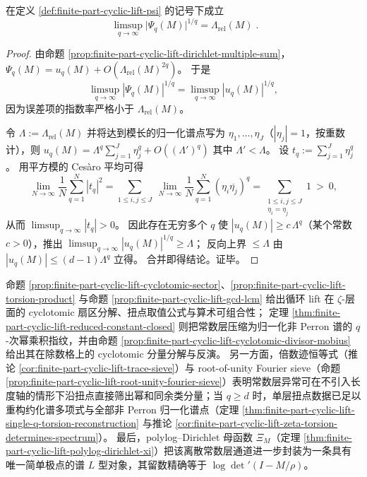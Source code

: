 \begin{theorem}[\(q\)-轴极限提取谱半径比]\label{thm:finite-part-cyclic-lift-limsup-spectral-gap}
在定义 \ref{def:finite-part-cyclic-lift-psi} 的记号下成立
\[
\boxed{\;
\limsup_{q\to\infty}\bigl|\Psi_q(M)\bigr|^{1/q}
=\Lambda_{\mathrm{rel}}(M)\; }.
\]
\end{theorem}
\begin{proof}
由命题 \ref{prop:finite-part-cyclic-lift-dirichlet-multiple-sum}，
\(
\Psi_q(M)=u_q(M)+O(\Lambda_{\mathrm{rel}}(M)^{2q})
\)。
于是
\[
\limsup_{q\to\infty}|\Psi_q(M)|^{1/q}
=\limsup_{q\to\infty}|u_q(M)|^{1/q},
\]
因为误差项的指数率严格小于 \(\Lambda_{\mathrm{rel}}(M)\)。
\par
令 \(\Lambda:=\Lambda_{\mathrm{rel}}(M)\) 并将达到模长的归一化谱点写为 \(\eta_1,\dots,\eta_J\)（\(|\eta_j|=1\)，按重数计），则
\(
 u_q(M)=\Lambda^{q}\sum_{j=1}^{J}\eta_j^{q}+O((\Lambda')^q)
\)
其中 \(\Lambda'<\Lambda\)。
设 \(t_q:=\sum_{j=1}^{J}\eta_j^{q}\)。
用平方模的 Ces\`aro 平均可得
\[
\lim_{N\to\infty}\frac{1}{N}\sum_{q=1}^{N}|t_q|^2
=\sum_{1\le i,j\le J}\ \lim_{N\to\infty}\frac{1}{N}\sum_{q=1}^{N}(\eta_i\overline{\eta_j})^{q}
=\sum_{\substack{1\le i,j\le J\\ \eta_i=\eta_j}}1\ >\ 0,
\]
从而 \(\limsup_{q\to\infty}|t_q|>0\)。
因此存在无穷多个 \(q\) 使 \(|u_q(M)|\ge c\,\Lambda^{q}\)（某个常数 \(c>0\)），推出
\(\limsup_{q\to\infty}|u_q(M)|^{1/q}\ge \Lambda\)；
反向上界 \(\le \Lambda\) 由 \(|u_q(M)|\le(d-1)\Lambda^{q}\) 立得。
合并即得结论。证毕。
\end{proof}

\begin{remark}\label{rem:finite-part-cyclic-lift-spectral-microscope}
命题 \ref{prop:finite-part-cyclic-lift-cyclotomic-sector}、\ref{prop:finite-part-cyclic-lift-torsion-product} 与命题 \ref{prop:finite-part-cyclic-lift-gcd-lcm} 给出循环 lift 在 \(\zeta\)-层面的 cyclotomic 扇区分解、扭点取值公式与算术可组合性；
定理 \ref{thm:finite-part-cyclic-lift-reduced-constant-closed} 则把常数层压缩为归一化非 Perron 谱的 \(q\)-次幂乘积指纹，并由命题 \ref{prop:finite-part-cyclic-lift-cyclotomic-divisor-mobius} 给出其在除数格上的 cyclotomic 分量分解与反演。
另一方面，倍数迹恒等式（推论 \ref{cor:finite-part-cyclic-lift-trace-sieve}）与 root-of-unity Fourier sieve（命题 \ref{prop:finite-part-cyclic-lift-root-unity-fourier-sieve}）表明常数层异常可在不引入长度轴的情形下沿扭点直接筛出幂和同余类分量；当 \(q\ge d\) 时，单层扭点数据已足以重构约化谱多项式与全部非 Perron 归一化谱点（定理 \ref{thm:finite-part-cyclic-lift-single-q-torsion-reconstruction} 与推论 \ref{cor:finite-part-cyclic-lift-zeta-torsion-determines-spectrum}）。
最后，polylog--Dirichlet 母函数 \(\Xi_M\)（定理 \ref{thm:finite-part-cyclic-lift-polylog-dirichlet-xi}）把该离散常数层通道进一步封装为一条具有唯一简单极点的谱 \(L\) 型对象，其留数精确等于 \(\log\det\nolimits'(I-M/\rho)\)。
\end{remark}